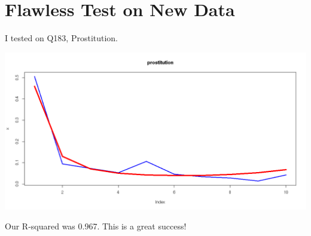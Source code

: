 \documentclass{amsart}
\begin{document}
\section{Flawless Test on New Data}

I tested on Q183, Prostitution. 

\includegraphics[scale=0.3]{fit_prost_may25.png}

Our R-squared was 0.967.  This is a great success!
\end{document}
